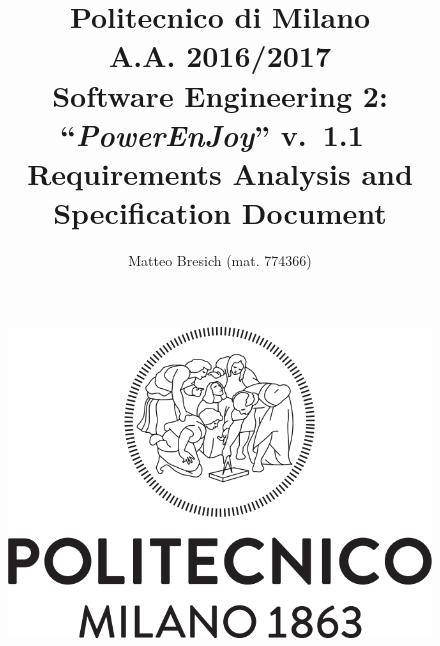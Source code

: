 \documentclass{article}
\newcommand{\version}{\mbox{\normalfont v. 1.1 }}
\begin{document}
	\title{Politecnico di Milano\\A.A. 2016/2017\\Software Engineering 2: ``{\em PowerEnJoy}'' \version \\ \bigskip \textbf{R}equirements \textbf{A}nalysis and \textbf{S}pecification \textbf{D}ocument}
	\author{Matteo Bresich (mat. 774366)}
	
	
	
	\begin{figure}[t]
		\centering
		\includegraphics[width=\linewidth]{"img/logo-polimi"}
		\label{fig:polimi-logo}
	\end{figure}

	\maketitle
	
	\thispagestyle{empty}
	\clearpage\mbox{}\thispagestyle{empty}\clearpage
	
	\renewcommand*\thesection{\arabic{section}}
	\renewcommand*\thesubsection{\arabic{section}.\arabic{subsection}}
	\renewcommand*\thesubsubsection{%
		\arabic{section}.\arabic{subsection}.\arabic{subsubsection}%
	}
	\setcounter{secnumdepth}{4}
	\setcounter{tocdepth}{4}
	
	\renewcommand{\contentsname}{Table of Content}
	\tableofcontents
	
\end{document}
